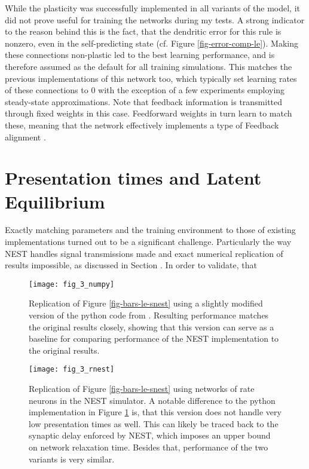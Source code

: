 While the plasticity was successfully implemented in all variants of the model, it did not prove useful for training the
networks during my tests. A strong indicator to the reason behind this is the fact, that the dendritic error for this 
rule is nonzero, even in the self-predicting state (cf. Figure \ref{fig-error-comp-le}). Making these connections non-plastic led to the best learning performance, and is therefore
assumed as the default for all training simulations. This matches the previous implementations of this network too,
which typically set learning rates of these connections to $0$ with the exception of a few experiments employing
steady-state approximations. Note that feedback information is transmitted through fixed weights in this case.
Feedforward weights in turn learn to match these, meaning that the network effectively implements a type of Feedback
alignment \cite{Lillicrap2014}.


\section{Presentation times and Latent Equilibrium}\label{sec-appendix-t-pres}

Exactly matching parameters and the training environment to those of existing implementations turned out to be a
significant challenge. Particularly the way NEST handles signal transmissions made and exact numerical replication of
results impossible, as discussed in Section . In order to validate, that



\begin{figure}[t]
  \centering
  \texttt{[image: fig\_3\_numpy]}
  \caption{Replication of Figure \ref{fig-bars-le-snest} using a slightly modified version of the python code from
    \cite{Haider2021}. Resulting performance matches the original results closely, showing that this version can serve
    as a baseline for comparing performance of the NEST implementation to the original results.}
  \label{fig-bars-le-numpy}
\end{figure}


\begin{figure}[t]
  \centering
  \texttt{[image: fig\_3\_rnest]}
  \caption{Replication of Figure \ref{fig-bars-le-snest} using networks of rate neurons in the NEST simulator. A notable
    difference to the python implementation in Figure \ref{fig-bars-le-numpy} is, that this version does not handle very
    low presentation times as well. This can likely be traced back to the synaptic delay enforced by NEST, which imposes
    an upper bound on network relaxation time. Besides that, performance of the two variants is very similar.}
  \label{fig-bars-le-rnest}
\end{figure}


